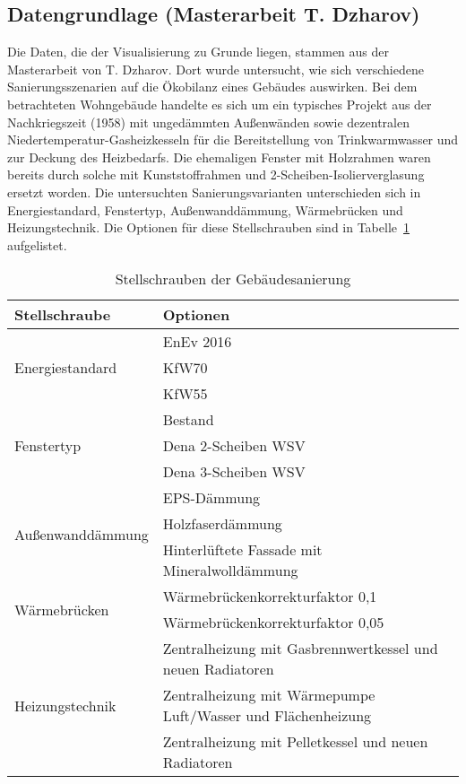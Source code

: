 \subsection{Datengrundlage (Masterarbeit T. Dzharov)}
Die Daten, die der Visualisierung zu Grunde liegen, stammen aus der Masterarbeit von T. Dzharov. Dort wurde untersucht, wie sich verschiedene Sanierungsszenarien auf die Ökobilanz eines Gebäudes auswirken. Bei dem betrachteten Wohngebäude handelte es sich um ein typisches Projekt aus der Nachkriegszeit (1958) mit ungedämmten Außenwänden sowie dezentralen Niedertemperatur-Gasheizkesseln für die Bereitstellung von Trinkwarmwasser und zur Deckung des Heizbedarfs. Die ehemaligen Fenster mit Holzrahmen waren bereits durch solche mit Kunststoffrahmen und 2-Scheiben-Isolierverglasung ersetzt worden. Die untersuchten Sanierungsvarianten unterschieden sich in Energiestandard, Fenstertyp, Außenwanddämmung, Wärmebrücken und Heizungstechnik. Die Optionen für diese Stellschrauben sind in Tabelle~\ref{tab:layers} aufgelistet. 
 
\begin{table}[htpb]
	\caption[Example table]{Stellschrauben der Gebäudesanierung}\label{tab:layers}
	\centering
	\begin{tabular}{l p{10cm}}
		\toprule
		Stellschraube & Optionen \\
		\midrule
		\multirow{3}{*}{Energiestandard} & EnEv 2016\\
		& KfW70 \\
		& KfW55\\ \hline
	    \multirow{3}{*}{Fenstertyp} & Bestand\\
		& Dena 2-Scheiben WSV \\
		& Dena 3-Scheiben WSV\\ \hline
	    \multirow{3}{*}{Außenwanddämmung} & EPS-Dämmung\\
		& Holzfaserdämmung \\
		& Hinterlüftete Fassade mit Mineralwolldämmung\\ \hline
	    \multirow{2}{*}{Wärmebrücken} & Wärmebrückenkorrekturfaktor 0,1\\
		& Wärmebrückenkorrekturfaktor 0,05 \\ \hline
	    \multirow{3}{*}{Heizungstechnik} & Zentralheizung mit Gasbrennwertkessel und neuen Radiatoren\\
		& Zentralheizung mit Wärmepumpe Luft/Wasser und Flächenheizung \\
		& Zentralheizung mit Pelletkessel und neuen Radiatoren\\ \hline
		\bottomrule
	\end{tabular}
\end{table}

